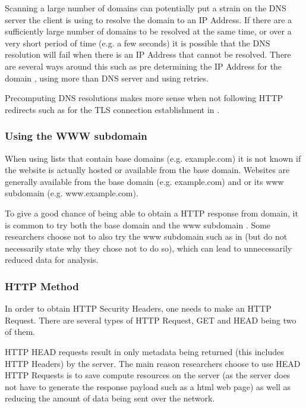 \documentclass{mscreport}
\begin{document}
\vspace{0.3cm} \noindent
Scanning a large number of domains can potentially put a strain on the DNS server the client is using to resolve the domain to an IP Address. If there are a sufficiently large number of domains to be resolved at the same time, or over a very short period of time (e.g. a few seconds) it is possible that the DNS resolution will fail when there is an IP Address that cannot be resolved. There are several ways around this such as pre determining the IP Address for the domain \cite{Amann2017-co}, using more than DNS server and using retries.

\vspace{0.3cm} \noindent
Precomputing DNS resolutions makes more sense when not following HTTP redirects such as for the TLS connection establishment in \cite{Amann2017-co,Holz2020-ha}.

\subsubsection{Using the WWW subdomain}

When using lists that contain base domains (e.g. example.com) it is not known if the website is actually hosted or available from the base domain. Websites are generally available from the base domain (e.g. example.com) and or its www subdomain (e.g. www.example.com).

\vspace{0.3cm} \noindent
To give a good chance of being able to obtain a HTTP response from domain, it is common to try both the base domain and the www subdomain \cite{Chen2016-dl,Kumar2017-qw,Ying2016-ag,Michael2015-hn}. Some researchers choose not to also try the www subdomain such as in \cite{Buchanan2018-xz,Amann2017-co} (but do not necessarily state why they chose not to do so), which can lead to unnecessarily reduced data for analysis.

\subsubsection{HTTP Method}
In order to obtain HTTP Security Headers, one needs to make an HTTP Request. There are several types of HTTP Request, GET and HEAD being two of them.

\vspace{0.3cm} \noindent
HTTP HEAD requests result in only metadata being returned (this includes HTTP Headers) by the server. The main reason researchers choose to use HEAD HTTP Requests \cite{Amann2017-co} is to save compute resources on the server (as the server does not have to generate the response payload such as a html web page) as well as reducing the amount of data being sent over the network.
\end{document}
